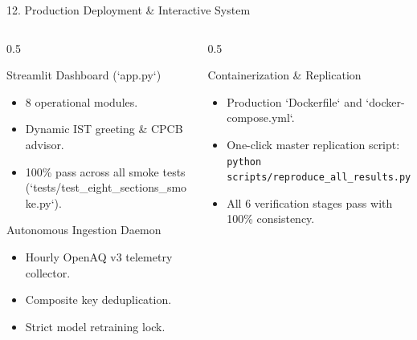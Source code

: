 \documentclass[aspectratio=169]{beamer}
\begin{document}
\begin{frame}{12. Production Deployment \& Interactive System}
  \begin{columns}
    \begin{column}{0.5\textwidth}
      \begin{block}{Streamlit Dashboard (`app.py`)}
        \begin{itemize}
          \item 8 operational modules.
          \item Dynamic IST greeting \& CPCB advisor.
          \item 100\% pass across all smoke tests (`tests/test_eight_sections_smoke.py`).
        \end{itemize}
      \end{block}
      \begin{block}{Autonomous Ingestion Daemon}
        \begin{itemize}
          \item Hourly OpenAQ v3 telemetry collector.
          \item Composite key deduplication.
          \item Strict model retraining lock.
        \end{itemize}
      \end{block}
    \end{column}
    \begin{column}{0.5\textwidth}
      \begin{block}{Containerization & Replication}
        \begin{itemize}
          \item Production `Dockerfile` and `docker-compose.yml`.
          \item One-click master replication script:
            \texttt{python scripts/reproduce\_all\_results.py}
          \item All 6 verification stages pass with 100\% consistency.
        \end{itemize}
      \end{block}
    \end{column}
  \end{columns}
\end{frame}
\end{document}
